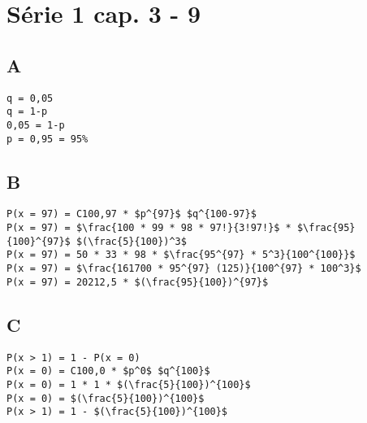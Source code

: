 \section*{Série 1 cap. 3 - 9}
\subsection*{A}
\begin{lstlisting}[mathescape]
q = 0,05
q = 1-p
0,05 = 1-p
p = 0,95 = 95%
\end{lstlisting}

\subsection*{B}
\begin{lstlisting}[mathescape]
P(x = 97) = C100,97 * $p^{97}$ $q^{100-97}$
P(x = 97) = $\frac{100 * 99 * 98 * 97!}{3!97!}$ * $\frac{95}{100}^{97}$ $(\frac{5}{100})^3$
P(x = 97) = 50 * 33 * 98 * $\frac{95^{97} * 5^3}{100^{100}}$
P(x = 97) = $\frac{161700 * 95^{97} (125)}{100^{97} * 100^3}$ 
P(x = 97) = 20212,5 * $(\frac{95}{100})^{97}$
\end{lstlisting}

\subsection*{C}
\begin{lstlisting}[mathescape]
P(x > 1) = 1 - P(x = 0)
P(x = 0) = C100,0 * $p^0$ $q^{100}$
P(x = 0) = 1 * 1 * $(\frac{5}{100})^{100}$
P(x = 0) = $(\frac{5}{100})^{100}$
P(x > 1) = 1 - $(\frac{5}{100})^{100}$
\end{lstlisting}
